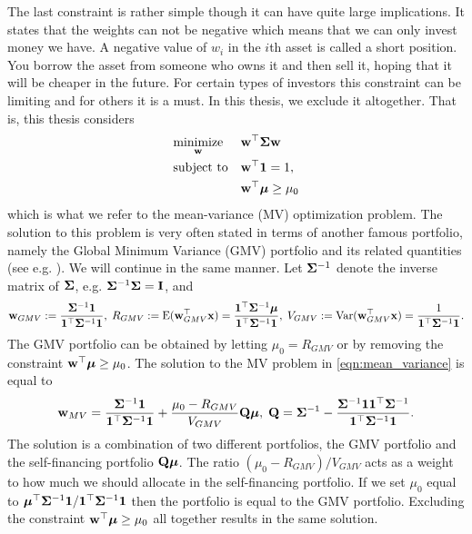 \documentclass[oneside]{book}\usepackage{knitr}
\begin{document}
The last constraint is rather simple though it can have quite large implications. 
It states that the weights can not be negative which means that we can only invest money we have. 
A negative value of $w_i$ in the $i$th asset is called a short position.
You borrow the asset from someone who owns it and then sell it, hoping that it will be cheaper in the future.
For certain types of investors this constraint can be limiting and for others it is a must.
In this thesis, we exclude it altogether. That is, this thesis considers
\begin{equation}\label{eqn:mean_variance}
\begin{aligned}
& \underset{\mathbf{w}}{\text{minimize}} 
& & \mathbf{w}^\top \mathbf{\Sigma} \mathbf{w} \\
& \text{subject to}
& & \mathbf{w}^\top \mathbf{1} = 1, \\
& && \mathbf{w}^\top \mbox{\boldmath$\mu$} \geq \mu_0 \\
\end{aligned}
\end{equation}
which is what we refer to the mean-variance (MV) optimization problem. 
The solution to this problem is very often stated in terms of another famous portfolio, namely the Global Minimum Variance (GMV) portfolio and its related quantities (see e.g. \textcite{Bodnar2009CaIotEFiEM, bodnar2013equivalence, bauder2018bayesian}). 
We will continue in the same manner. 
Let $\mathbf{\Sigma}^{-1}$ denote the inverse matrix of $\mathbf{\Sigma}$, e.g. $\mathbf{\Sigma}^{-1}\mathbf{\Sigma} = \mathbf{I}$, and
\begin{equation}\label{eqn:GMV}
	\mathbf{w}_{GMV} := \frac{\mathbf{\Sigma}^{-1}\mathbf{1}}{\mathbf{1}^\top \mathbf{\Sigma}^{-1}\mathbf{1}}, \; R_{GMV} :=\operatorname{E}(\mathbf{w}_{GMV}^\top\mathbf{x}) = \frac{\mathbf{1}^\top\mathbf{\Sigma}^{-1}\mbox{\boldmath$\mu$}}{\mathbf{1}^\top \mathbf{\Sigma}^{-1}\mathbf{1}}, \;
	V_{GMV} := \operatorname{Var}(\mathbf{w}_{GMV}^\top\mathbf{x}) =\frac{1}{\mathbf{1}^\top \mathbf{\Sigma}^{-1}\mathbf{1}}.
\end{equation}
The GMV portfolio can be obtained by letting $\mu_0=R_{GMV}$ or by removing the constraint $\mathbf{w}^\top \mbox{\boldmath$\mu$} \geq \mu_0$. 
The solution to the MV problem in \eqref{eqn:mean_variance} is equal to
\begin{equation}\label{eqn:mean_var_solution}
	\mathbf{w}_{MV} = \frac{\mathbf{\Sigma}^{-1}\mathbf{1}}{\mathbf{1}^\top \mathbf{\Sigma}^{-1}\mathbf{1}} + \frac{\mu_0 - R_{GMV}}{V_{GMV}} \mathbf{Q} \mbox{\boldmath$\mu$},\; \mathbf{Q} = \mathbf{\Sigma}^{-1} - \frac{\mathbf{\Sigma}^{-1} \mathbf{1} \mathbf{1}^\top \mathbf{\Sigma}^{-1}}{\mathbf{1}^\top \mathbf{\Sigma}^{-1} \mathbf{1}}.
\end{equation}
The solution is a combination of two different portfolios, the GMV portfolio and the self-financing portfolio $\mathbf{Q} \mbox{\boldmath$\mu$}$. 
The ratio $(\mu_0 - R_{GMV})/V_{GMV}$ acts as a weight to how much we should allocate in the self-financing portfolio. If we set $\mu_0$ equal to $\mbox{\boldmath$\mu$}^\top \mathbf{\Sigma}^{-1} \mathbf{1} / \mathbf{1}^\top \mathbf{\Sigma}^{-1} \mathbf{1}$ then the portfolio is equal to the GMV portfolio. Excluding the constraint $\mathbf{w}^\top \mbox{\boldmath$\mu$} \geq \mu_0$ all together results in the same solution. 
\end{document}
